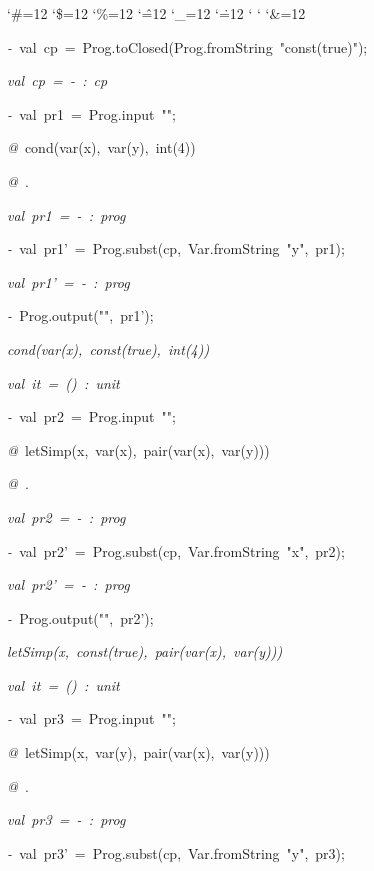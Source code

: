 \begin{list}{}
{\setlength{\leftmargin}{\leftmargini}
\setlength{\rightmargin}{0cm}
\setlength{\itemindent}{0cm}
\setlength{\listparindent}{0cm}
\setlength{\itemsep}{0cm}
\setlength{\parsep}{0cm}
\setlength{\labelsep}{0cm}
\setlength{\labelwidth}{0cm}
\catcode`\#=12
\catcode`\$=12
\catcode`\%=12
\catcode`\^=12
\catcode`\_=12
\catcode`\.=12
\catcode`
\catcode`
\catcode`\&=12
\ttfamily}
\small
\item[]\textsl{-\ }val\ cp\ =\ Prog.toClosed(Prog.fromString\ "const(true)");
\item[]\textsl{val\ cp\ =\ -\ :\ cp}
\item[]\textsl{-\ }val\ pr1\ =\ Prog.input\ "";
\item[]\textsl{@\ }cond(var(x),\ var(y),\ int(4))
\item[]\textsl{@\ }.
\item[]\textsl{val\ pr1\ =\ -\ :\ prog}
\item[]\textsl{-\ }val\ pr1'\ =\ Prog.subst(cp,\ Var.fromString\ "y",\ pr1);
\item[]\textsl{val\ pr1'\ =\ -\ :\ prog}
\item[]\textsl{-\ }Prog.output("",\ pr1');
\item[]\textsl{cond(var(x),\ const(true),\ int(4))}
\item[]\textsl{val\ it\ =\ ()\ :\ unit}
\item[]\textsl{-\ }val\ pr2\ =\ Prog.input\ "";
\item[]\textsl{@\ }letSimp(x,\ var(x),\ pair(var(x),\ var(y)))
\item[]\textsl{@\ }.
\item[]\textsl{val\ pr2\ =\ -\ :\ prog}
\item[]\textsl{-\ }val\ pr2'\ =\ Prog.subst(cp,\ Var.fromString\ "x",\ pr2);
\item[]\textsl{val\ pr2'\ =\ -\ :\ prog}
\item[]\textsl{-\ }Prog.output("",\ pr2');
\item[]\textsl{letSimp(x,\ const(true),\ pair(var(x),\ var(y)))}
\item[]\textsl{val\ it\ =\ ()\ :\ unit}
\item[]\textsl{-\ }val\ pr3\ =\ Prog.input\ "";
\item[]\textsl{@\ }letSimp(x,\ var(y),\ pair(var(x),\ var(y)))
\item[]\textsl{@\ }.
\item[]\textsl{val\ pr3\ =\ -\ :\ prog}
\item[]\textsl{-\ }val\ pr3'\ =\ Prog.subst(cp,\ Var.fromString\ "y",\ pr3);

\end{list}
